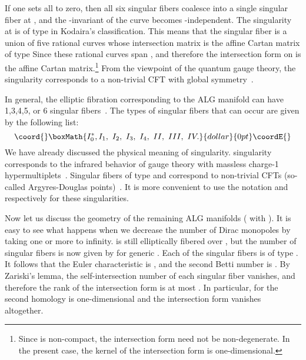 \documentclass[a4paper,12pt, amsfonts, amssymb]{article}
\providecommand{\CC}{{\mathbb C}}
\begin{document}
If one sets all \coordHE{} to zero,
then all six singular fibers coalesce into a single singular fiber
at \coordHE{}, and the \coordHE{}-invariant of the curve becomes \coordHE{}-independent. The singularity at \coordHE{} is of type
\coordHE{} in Kodaira's classification. This means
that the singular fiber is a union of five rational curves whose intersection
matrix is the affine Cartan matrix of type \coordHE{} Since \coordHE{}
these rational curves span \coordHE{}, and therefore the
intersection form on \coordHE{} is the affine \coordHE{} Cartan
matrix.\footnote{Since \coordHE{} is non-compact, the intersection form need
not be non-degenerate. In the present case, the kernel of the intersection form is one-dimensional.} From the viewpoint of the quantum \coordHE{} gauge theory, the \coordHE{}
singularity corresponds to a non-trivial CFT with global
\coordHE{} symmetry~\cite{SW2}.


In general, the elliptic fibration corresponding to the \coordHE{} ALG manifold
can have 1,3,4,5, or 6 singular fibers~\cite{SW2,APSW}. The types of singular
fibers that can occur are given by the following list:
$$\coord{}\boxMath{
I_0^*, I_1,\ I_2,\ I_3,\ I_4,\ II,\ III,\ IV.
}{dollar}{0pt}\coordE{}$$
We have already discussed the physical meaning of \coordHE{}
singularity. \coordHE{} singularity corresponds to the infrared behavior
of \coordHE{}  \coordHE{} gauge theory with \coordHE{} massless charge-1
hypermultiplets~\cite{SW2}. Singular fibers of type \coordHE{}  \coordHE{} and \coordHE{} correspond to non-trivial CFTs (so-called Argyres-Douglas points)~\cite{APSW}.
It is more convenient to use the notation \coordHE{} and
\coordHE{} respectively for these singularities.

Now let us discuss the geometry of the remaining ALG manifolds (\coordHE{}
with \coordHE{}).
It is easy to see what happens when we decrease the number of Dirac
monopoles \coordHE{} by taking one or more \coordHE{} to infinity. \coordHE{} is still
elliptically fibered over \myHighlight{$\CC$}\coordHE{}, but the number of singular fibers is now
given by \coordHE{} for generic \coordHE{}. Each of the singular fibers is of type \coordHE{}. It follows that the Euler characteristic is \coordHE{}, and the second Betti number is \coordHE{}. By Zariski's lemma, the self-intersection number
of each singular fiber vanishes, and therefore the rank of the intersection form is at most \coordHE{}. In particular, for \coordHE{} the second
homology is one-dimensional and the intersection form vanishes
altogether.
\end{document}
